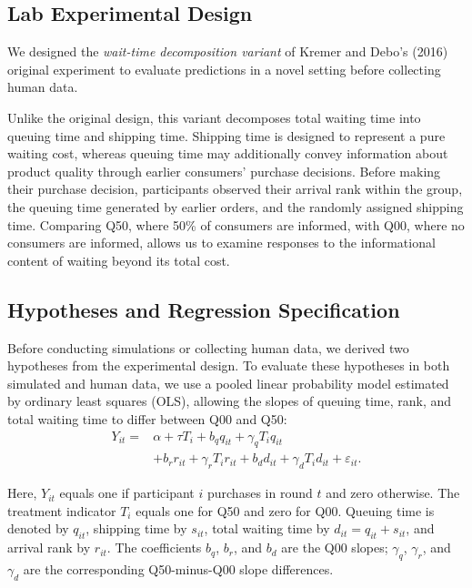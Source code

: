 \documentclass[12pt,letterpaper]{article}
\begin{document}
\subsection{Lab Experimental Design}
\label{app:decomposition-design}

We designed the \textit{wait-time decomposition variant} of
Kremer and Debo's (2016) original experiment to evaluate
predictions in a novel setting before collecting human data.

Unlike the original design, this variant decomposes total
waiting time into queuing time and shipping time. Shipping time
is designed to represent a pure waiting cost, whereas queuing
time may additionally convey information about product quality
through earlier consumers' purchase decisions. Before making their purchase decision, participants observed their arrival rank within the group, the queuing time generated by earlier orders, and the randomly assigned shipping time. Comparing Q50,
where 50\% of consumers are informed, with Q00, where no consumers
are informed, allows us to examine responses to the informational
content of waiting beyond its total cost.

\subsection{Hypotheses and Regression Specification}
\label{app:decomposition-specification}

Before conducting simulations or collecting human data, we
derived two hypotheses from the experimental design. To evaluate
these hypotheses in both simulated and human data, we use a
pooled linear probability model estimated by ordinary least
squares (OLS), allowing the slopes of queuing time, rank, and
total waiting time to differ between Q00 and Q50:
\begin{equation}
\begin{aligned}
Y_{it}
={}& \alpha + \tau T_i
   + b_q q_{it} + \gamma_q T_i q_{it} \\
 & + b_r r_{it} + \gamma_r T_i r_{it}
   + b_d d_{it} + \gamma_d T_i d_{it}
   + \varepsilon_{it}.
\end{aligned}
\label{eq:decomposition-model}
\end{equation}

Here, $Y_{it}$ equals one if participant $i$ purchases in round
$t$ and zero otherwise. The treatment indicator $T_i$ equals
one for Q50 and zero for Q00. Queuing time is denoted by
$q_{it}$, shipping time by $s_{it}$, total waiting time by
$d_{it}=q_{it}+s_{it}$, and arrival rank by $r_{it}$.
The coefficients $b_q$, $b_r$, and $b_d$ are the Q00 slopes;
$\gamma_q$, $\gamma_r$, and $\gamma_d$ are the corresponding
Q50-minus-Q00 slope differences.
\end{document}
